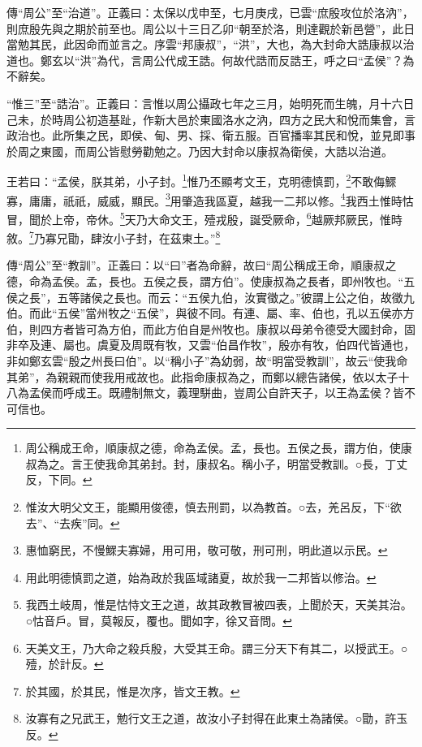 {\noindent\zhuan{}\fzbyks 傳“周公”至“治道”。正義曰：太保以戊申至，七月庚戌，已雲“庶殷攻位於洛汭”，則庶殷先與之期於前至也。周公以十三日乙卯“朝至於洛，則達觀於新邑營”，此日當勉其民，此因命而並言之。序雲“邦康叔”，“洪”，大也，為大封命大誥康叔以治道也。鄭玄以“洪”為代，言周公代成王誥。何故代誥而反誥王，呼之曰“孟侯”？為不辭矣。 \par}

{\noindent\shu{}\fzkt “惟三”至“誥治”。正義曰：言惟以周公攝政七年之三月，始明死而生魄，月十六日己未，於時周公初造基趾，作新大邑於東國洛水之汭，四方之民大和悅而集會，言政治也。此所集之民，即侯、甸、男、採、衛五服。百官播率其民和悅，並見即事於周之東國，而周公皆慰勞勸勉之。乃因大封命以康叔為衛侯，大誥以治道。 \par}

王若曰：“孟侯，朕其弟，小子封。\footnote{周公稱成王命，順康叔之德，命為孟侯。孟，長也。五侯之長，謂方伯，使康叔為之。言王使我命其弟封。封，康叔名。稱小子，明當受教訓。○長，丁丈反，下同。}惟乃丕顯考文王，克明德慎罰，\footnote{惟汝大明父文王，能顯用俊德，慎去刑罰，以為教首。○去，羌呂反，下“欲去”、“去疾”同。}不敢侮鰥寡，庸庸，祇祇，威威，顯民。\footnote{惠恤窮民，不慢鰥夫寡婦，用可用，敬可敬，刑可刑，明此道以示民。}用肇造我區夏，越我一二邦以修。\footnote{用此明德慎罰之道，始為政於我區域諸夏，故於我一二邦皆以修治。}我西土惟時怙冒，聞於上帝，帝休。\footnote{我西土岐周，惟是怙恃文王之道，故其政教冒被四表，上聞於天，天美其治。○怙音戶。冒，莫報反，覆也。聞如字，徐又音問。}天乃大命文王，殪戎殷，誕受厥命，\footnote{天美文王，乃大命之殺兵殷，大受其王命。謂三分天下有其二，以授武王。○殪，於計反。}越厥邦厥民，惟時敘。\footnote{於其國，於其民，惟是次序，皆文王教。}乃寡兄勖，肆汝小子封，在茲東土。”\footnote{汝寡有之兄武王，勉行文王之道，故汝小子封得在此東土為諸侯。○勖，許玉反。}


{\noindent\zhuan{}\fzbyks 傳“周公”至“教訓”。正義曰：以“曰”者為命辭，故曰“周公稱成王命，順康叔之德，命為孟侯。孟，長也。五侯之長，謂方伯”。使康叔為之長者，即州牧也。“五侯之長”，五等諸侯之長也。而云：“五侯九伯，汝實徵之。”彼謂上公之伯，故徵九伯。而此“五侯”當州牧之“五侯”，與彼不同。有連、屬、率、伯也，孔以五侯亦方伯，則四方者皆可為方伯，而此方伯自是州牧也。康叔以母弟令德受大國封命，固非卒及連、屬也。虞夏及周既有牧，又雲“伯昌作牧”，殷亦有牧，伯四代皆通也，非如鄭玄雲“殷之州長曰伯”。以“稱小子”為幼弱，故“明當受教訓”，故云“使我命其弟”，為親親而使我用戒故也。此指命康叔為之，而鄭以總告諸侯，依以太子十八為孟侯而呼成王。既禮制無文，義理駢曲，豈周公自許天子，以王為孟侯？皆不可信也。 \par}

